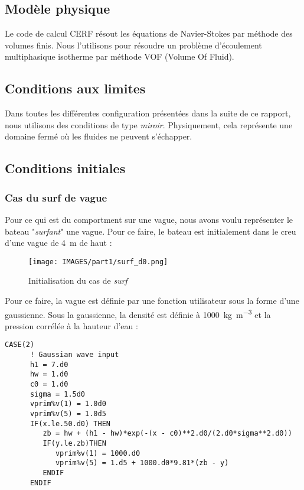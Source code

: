 \documentclass[../main.tex]{subfiles}
\begin{document}
\subsection{Modèle physique}

Le code de calcul CERF résout les équations de Navier-Stokes par méthode des volumes finis.
Nous l'utilisons pour résoudre un problème d'écoulement multiphasique isotherme par méthode VOF (Volume Of Fluid).



\subsection{Conditions aux limites}

Dans toutes les différentes configuration présentées dans la suite de ce rapport, nous utilisons des conditions de type \textit{miroir}.
Physiquement, cela représente une domaine fermé où les fluides ne peuvent s'échapper.





\subsection{Conditions initiales}

\subsubsection{Cas du surf de vague}
Pour ce qui est du comportment sur une vague, nous avons voulu représenter le bateau "\textit{surfant}" une vague. Pour ce faire, le bateau est initialement dans le creu d'une vague de \qty{4}{\meter} de haut :
\begin{figure}[H]
    \centering
    \texttt{[image: IMAGES/part1/surf\_d0.png]}
    \caption{Initialisation du cas de \textit{surf}}
\end{figure}

Pour ce faire, la vague est définie par une fonction utilisateur sous la forme d'une gaussienne. Sous la gaussienne, la densité est définie à \qty{1000}{\kilo\g\per\cubic\meter} et la pression corrélée à la hauteur d'eau :
\begin{lstlisting}[style=f90, caption={Fonction utilisateur pour le cas de \textit{surf}}, captionpos=b]
    CASE(2)
      ! Gaussian wave input
      h1 = 7.d0
      hw = 1.d0
      c0 = 1.d0
      sigma = 1.5d0
      vprim%v(1) = 1.0d0
      vprim%v(5) = 1.0d5
      IF(x.le.50.d0) THEN
         zb = hw + (h1 - hw)*exp(-(x - c0)**2.d0/(2.d0*sigma**2.d0))
         IF(y.le.zb)THEN
            vprim%v(1) = 1000.d0
            vprim%v(5) = 1.d5 + 1000.d0*9.81*(zb - y)
         ENDIF
      ENDIF
\end{lstlisting}
\end{document}
